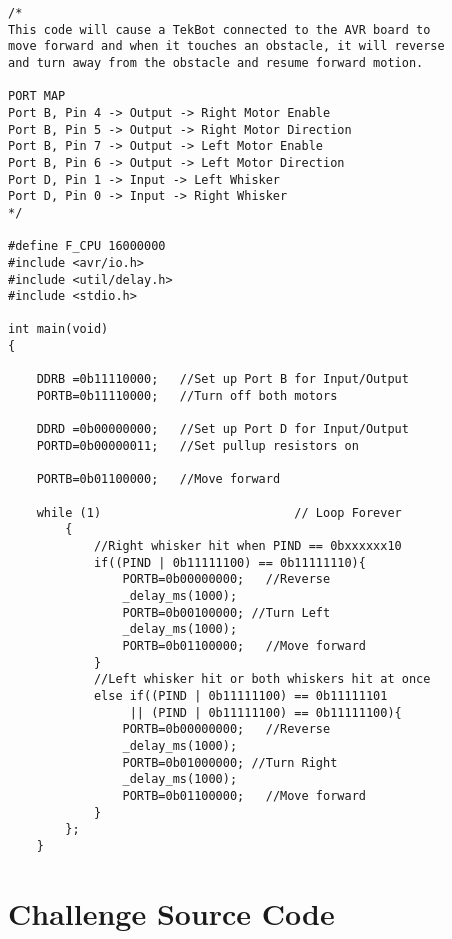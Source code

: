 \documentclass[12pt,letterpaper]{article}
\begin{document}
\begin{verbatim}
/*
This code will cause a TekBot connected to the AVR board to
move forward and when it touches an obstacle, it will reverse
and turn away from the obstacle and resume forward motion.

PORT MAP
Port B, Pin 4 -> Output -> Right Motor Enable
Port B, Pin 5 -> Output -> Right Motor Direction
Port B, Pin 7 -> Output -> Left Motor Enable
Port B, Pin 6 -> Output -> Left Motor Direction
Port D, Pin 1 -> Input -> Left Whisker
Port D, Pin 0 -> Input -> Right Whisker
*/

#define F_CPU 16000000
#include <avr/io.h>
#include <util/delay.h>
#include <stdio.h>

int main(void)
{

    DDRB =0b11110000;   //Set up Port B for Input/Output
    PORTB=0b11110000;   //Turn off both motors

    DDRD =0b00000000;   //Set up Port D for Input/Output
    PORTD=0b00000011;   //Set pullup resistors on

    PORTB=0b01100000;   //Move forward
    
    while (1)                           // Loop Forever
        {
            //Right whisker hit when PIND == 0bxxxxxx10
            if((PIND | 0b11111100) == 0b11111110){
                PORTB=0b00000000;   //Reverse
                _delay_ms(1000);
                PORTB=0b00100000; //Turn Left
                _delay_ms(1000);
                PORTB=0b01100000;   //Move forward
            }
            //Left whisker hit or both whiskers hit at once
            else if((PIND | 0b11111100) == 0b11111101
                 || (PIND | 0b11111100) == 0b11111100){
                PORTB=0b00000000;   //Reverse
                _delay_ms(1000);
                PORTB=0b01000000; //Turn Right
                _delay_ms(1000);
                PORTB=0b01100000;   //Move forward
            }
        };
    }
\end{verbatim}

\pagebreak

\section{Challenge Source Code}
\end{document}
